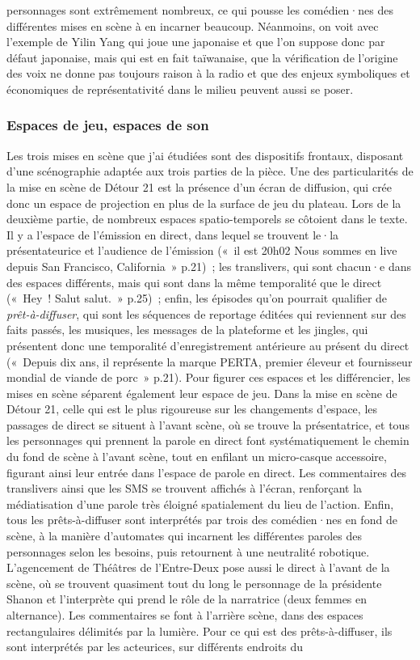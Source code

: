 \documentclass[
]{article}
\begin{document}
personnages sont extrêmement nombreux, ce qui pousse les comédien·nes des différentes mises en scène à en incarner beaucoup. Néanmoins, on voit avec l'exemple de Yilin Yang qui joue une japonaise et que l'on suppose donc par défaut japonaise, mais qui est en fait taïwanaise, que la vérification de l'origine des voix ne donne pas toujours raison à la radio et que des enjeux symboliques et économiques de représentativité dans le milieu peuvent aussi se poser.

\subsubsection{Espaces de jeu, espaces de son}\label{espaces-de-jeu-espaces-de-son}

Les trois mises en scène que j'ai étudiées sont des dispositifs frontaux, disposant d'une scénographie adaptée aux trois parties de la pièce. Une des particularités de la mise en scène de Détour 21 est la présence d'un écran de diffusion, qui crée donc un espace de projection en plus de la surface de jeu du plateau. Lors de la deuxième partie, de nombreux espaces spatio-temporels se côtoient dans le texte. Il y a l'espace de l'émission en direct, dans lequel se trouvent le·la présentateurice et l'audience de l'émission («~il est 20h02 Nous sommes en live depuis San Francisco, California~» p.21)~; les translivers, qui sont chacun·e dans des espaces différents, mais qui sont dans la même temporalité que le direct («~Hey~! Salut salut.~» p.25)~; enfin, les épisodes qu'on pourrait qualifier de \emph{prêt-à-diffuser}, qui sont les séquences de reportage éditées qui reviennent sur des faits passés, les musiques, les messages de la plateforme et les jingles, qui présentent donc une temporalité d'enregistrement antérieure au présent du direct («~Depuis dix ans, il représente la marque PERTA, premier éleveur et fournisseur mondial de viande de porc~» p.21). Pour figurer ces espaces et les différencier, les mises en scène séparent également leur espace de jeu. Dans la mise en scène de Détour 21, celle qui est le plus rigoureuse sur les changements d'espace, les passages de direct se situent à l'avant scène, où se trouve la présentatrice, et tous les personnages qui prennent la parole en direct font systématiquement le chemin du fond de scène à l'avant scène, tout en enfilant un micro-casque accessoire, figurant ainsi leur entrée dans l'espace de parole en direct. Les commentaires des translivers ainsi que les SMS se trouvent affichés à l'écran, renforçant la médiatisation d'une parole très éloigné spatialement du lieu de l'action. Enfin, tous les prêts-à-diffuser sont interprétés par trois des comédien·nes en fond de scène, à la manière d'automates qui incarnent les différentes paroles des personnages selon les besoins, puis retournent à une neutralité robotique. L'agencement de Théâtres de l'Entre-Deux pose aussi le direct à l'avant de la scène, où se trouvent quasiment tout du long le personnage de la présidente Shanon et l'interprète qui prend le rôle de la narratrice (deux femmes en alternance). Les commentaires se font à l'arrière scène, dans des espaces rectangulaires délimités par la lumière. Pour ce qui est des prêts-à-diffuser, ils sont interprétés par les acteurices, sur différents endroits du 
\end{document}
